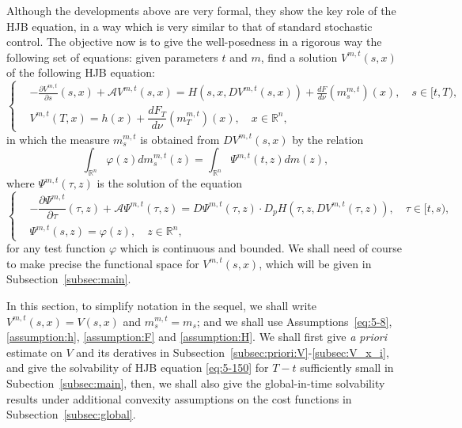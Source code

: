 \documentclass[11pt]{article}
\numberwithin{equation}{section}
\newcommand{\brn}{{\mathbb{R}^n}}
\newcommand{\1}{\mbox{1\hspace{-1mm}I}}
\begin{document}
Although the developments above are very formal, they show the key role of the HJB equation, in a way which is very similar to that of standard stochastic control. The objective now is to give the well-posedness in a rigorous way the following set of equations: given parameters $t$ and $m$, find a solution $V^{m,t}(s,x)$ of the following HJB equation:
\begin{equation}\label{eq:5-150}
    \left\{
    \begin{aligned}
        &-\frac{\partial V^{m,t}}{\partial s}(s,x)+\mathcal{A}V^{m,t}(s,x)=H\left(s,x,DV^{m,t}(s,x)\right)+\frac{dF}{d\nu}\left(m^{m,t}_s\right)(x),\quad s\in[t,T),\\
        &V^{m,t}(T,x)=h(x)+\dfrac{dF_T}{d\nu}\left(m^{m,t}_T\right)(x),\quad x\in\brn,
    \end{aligned}
    \right.
\end{equation}
in which the measure $m^{m,t}_s$ is obtained from $DV^{m,t}(s,x)$
by the relation 
\begin{equation}
    \int_{\brn}\varphi(z)dm^{m,t}_s(z)=\int_{\brn}\Psi^{m,t}(t,z)dm(z), \label{eq:5-151}
\end{equation}
where $\Psi^{m,t}(\tau,z)$ is the solution of the equation 
\begin{equation}\label{eq:5-152}
\left\{
    \begin{aligned}
        &-\dfrac{\partial\Psi^{m,t}}{\partial\tau}(\tau,z)+\mathcal{A}\Psi^{m,t}(\tau,z)=D\Psi^{m,t}(\tau,z)\cdot D_p H\left(\tau,z,DV^{m,t}(\tau,z)\right),\quad \tau\in[t,s),\\
        &\Psi^{m,t}(s,z)=\varphi(z),\quad z\in\brn,
    \end{aligned}
\right.
\end{equation}
for any test function $\varphi$ which is continuous and bounded. We shall need of course to make precise the functional space for $V^{m,t}(s,x)$, %
which will be given in Subsection~\ref{subsec:main}. 

In this section, to simplify notation in the sequel, we shall write $V^{m,t}(s,x)=V(s,x)$ and $m^{m,t}_s=m_s$; and we shall use Assumptions~\ref{eq:5-8}, \ref{assumption:h}, \ref{assumption:F} and \ref{assumption:H}. We shall first give \textit{a priori} estimate on $V$ and its deratives in Subsection~\ref{subsec:priori:V}-\ref{subsec:V_x_i}, and give the solvability of HJB equation \eqref{eq:5-150} for $T-t$ sufficiently small in Subection~\ref{subsec:main}, then, we shall also give the global-in-time solvability results under additional convexity assumptions on the cost functions in Subsection~\ref{subsec:global}.
\end{document}
